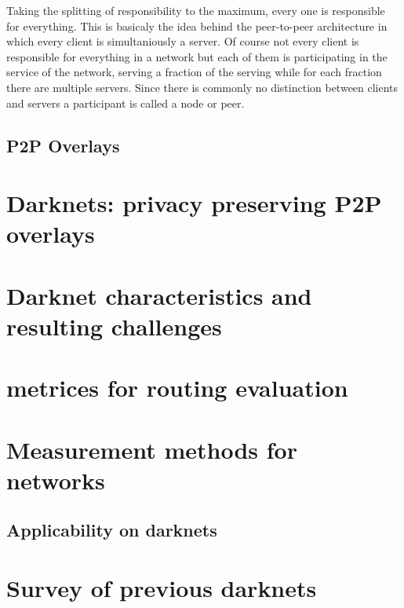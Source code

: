 Taking the splitting of responsibility to the maximum, every one is responsible for everything. This is basicaly the idea behind the peer-to-peer architecture in which every client is simultaniously a server. Of course not every client is responsible for everything in a network but each of them is participating in the service of the network, serving a fraction of the serving while for each fraction there are multiple servers. Since there is commonly no distinction between clients and servers a participant is called a node or peer.

\subsection{P2P Overlays}



\section{Darknets: privacy preserving P2P overlays}



\section{Darknet characteristics and resulting challenges}



\section{metrices for routing evaluation}



\section{Measurement methods for networks}


\subsection{Applicability on darknets}



\section{Survey of previous darknets}


